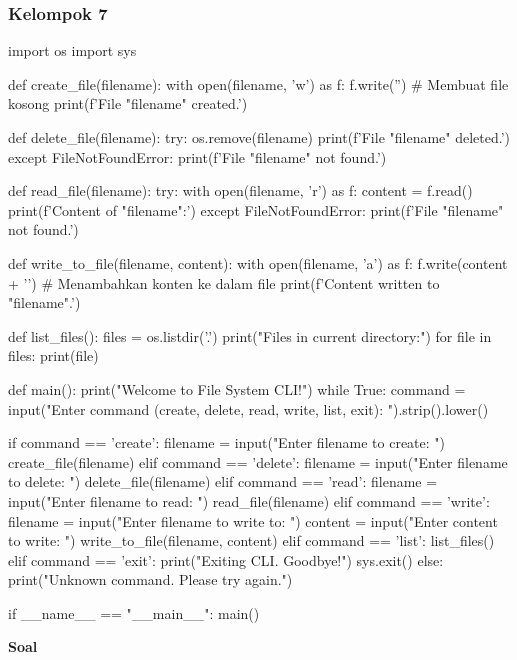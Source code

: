 \documentclass[12pt]{article}
\begin{document}
\subsubsection{Kelompok 7}
\begin{python}
import os
import sys

def create_file(filename):
    with open(filename, 'w') as f:
        f.write('')  # Membuat file kosong
    print(f'File "{filename}" created.')

def delete_file(filename):
    try:
        os.remove(filename)
        print(f'File "{filename}" deleted.')
    except FileNotFoundError:
        print(f'File "{filename}" not found.')

def read_file(filename):
    try:
        with open(filename, 'r') as f:
            content = f.read()
        print(f'Content of "{filename}":')
    except FileNotFoundError:
        print(f'File "{filename}" not found.')

def write_to_file(filename, content):
    with open(filename, 'a') as f:
        f.write(content + '\n')  # Menambahkan konten ke dalam file
    print(f'Content written to "{filename}".')

def list_files():
    files = os.listdir('.')
    print("Files in current directory:")
    for file in files:
        print(file)

def main():
    print("Welcome to File System CLI!")
    while True:
        command = input("Enter command (create, delete, read, write, list, exit): ").strip().lower()
        
        if command == 'create':
            filename = input("Enter filename to create: ")
            create_file(filename)
        elif command == 'delete':
            filename = input("Enter filename to delete: ")
            delete_file(filename)
        elif command == 'read':
            filename = input("Enter filename to read: ")
            read_file(filename)
        elif command == 'write':
            filename = input("Enter filename to write to: ")
            content = input("Enter content to write: ")
            write_to_file(filename, content)
        elif command == 'list':
            list_files()
        elif command == 'exit':
            print("Exiting CLI. Goodbye!")
            sys.exit()
        else:
            print("Unknown command. Please try again.")

    if __name__ == "__main__":
        main()
\end{python}

\textbf{Soal}
\end{document}
